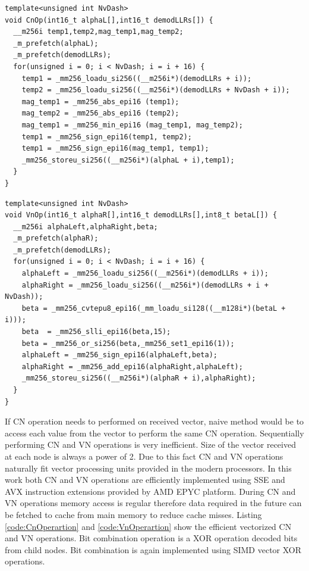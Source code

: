 \begin{code}
\label{code:CnOperartion}
\begin{verbatim}
template<unsigned int NvDash>
void CnOp(int16_t alphaL[],int16_t demodLLRs[]) {
  __m256i temp1,temp2,mag_temp1,mag_temp2;
  _m_prefetch(alphaL);
  _m_prefetch(demodLLRs);
  for(unsigned i = 0; i < NvDash; i = i + 16) {
	temp1 = _mm256_loadu_si256((__m256i*)(demodLLRs + i));
	temp2 = _mm256_loadu_si256((__m256i*)(demodLLRs + NvDash + i));
	mag_temp1 = _mm256_abs_epi16 (temp1);
	mag_temp2 = _mm256_abs_epi16 (temp2);
	mag_temp1 = _mm256_min_epi16 (mag_temp1, mag_temp2);
	temp1 = _mm256_sign_epi16(temp1, temp2);
	temp1 = _mm256_sign_epi16(mag_temp1, temp1);
	_mm256_storeu_si256((__m256i*)(alphaL + i),temp1);
  }
}
\end{verbatim}
\end{code}
\begin{code}
\label{code:VnOperartion}
\begin{verbatim}
template<unsigned int NvDash>
void VnOp(int16_t alphaR[],int16_t demodLLRs[],int8_t betaL[]) {
  __m256i alphaLeft,alphaRight,beta;
  _m_prefetch(alphaR);
  _m_prefetch(demodLLRs);
  for(unsigned i = 0; i < NvDash; i = i + 16) {
    alphaLeft = _mm256_loadu_si256((__m256i*)(demodLLRs + i));
    alphaRight = _mm256_loadu_si256((__m256i*)(demodLLRs + i + NvDash));
    beta = _mm256_cvtepu8_epi16(_mm_loadu_si128((__m128i*)(betaL + i)));
    beta  = _mm256_slli_epi16(beta,15);
    beta = _mm256_or_si256(beta,_mm256_set1_epi16(1));
    alphaLeft = _mm256_sign_epi16(alphaLeft,beta);
    alphaRight = _mm256_add_epi16(alphaRight,alphaLeft);
    _mm256_storeu_si256((__m256i*)(alphaR + i),alphaRight);
  }
}
\end{verbatim}
\end{code}
If CN operation needs to performed on received vector, naive method would be to access each value from the vector to perform the same CN operation. Sequentially performing CN and VN operations is very inefficient. Size of the vector received at each node is always a power of 2. Due to this fact CN and VN operations naturally fit vector processing units provided in the modern processors. In this work both CN and VN operations are efficiently implemented using SSE and AVX instruction extensions provided by AMD EPYC platform. During CN and VN operations memory access is regular therefore data required in the future can be fetched to cache from main memory to reduce cache misses. Listing \ref{code:CnOperartion} and \ref{code:VnOperartion} show the efficient vectorized CN and VN operations. Bit combination operation is a XOR operation decoded bits from child nodes. Bit combination is again implemented using SIMD vector XOR operations.


